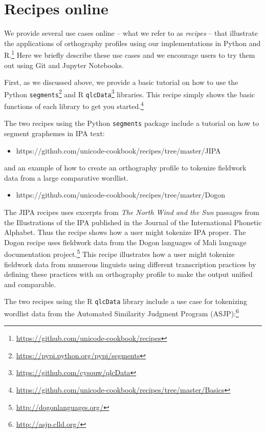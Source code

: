 \documentclass[output=book,nonflat,modfonts,
citecolor=brown,
		]{langsci/langscibook}\usepackage[]{graphicx}\usepackage[]{color}
\begin{document}
\section{Recipes online}
\label{use-cases}

We provide several use cases online -- what we refer to as \textit{recipes} -- that illustrate the applications of orthography profiles using our implementations in Python and R.\footnote{\url{https://github.com/unicode-cookbook/recipes}} Here we briefly describe these use cases and we encourage users to try them out using Git and Jupyter Notebooks.

First, as we discussed above, we provide a basic tutorial on how to use the Python \texttt{segments}\footnote{\url{https://pypi.python.org/pypi/segments}} and R \texttt{qlcData}\footnote{\url{https://github.com/cysouw/qlcData}} libraries. This recipe simply shows the basic functions of each library to get you started.\footnote{\url{https://github.com/unicode-cookbook/recipes/tree/master/Basics}}

The two recipes using the Python \texttt{segments} package include a tutorial on how to segment graphemes in IPA text:

\begin{itemize}
	\item https://github.com/unicode-cookbook/recipes/tree/master/JIPA
\end{itemize}
	
\noindent and an example of how to create an orthography profile to tokenize fieldwork data from a large comparative wordlist.

\begin{itemize}
	\item https://github.com/unicode-cookbook/recipes/tree/master/Dogon
\end{itemize}

\noindent The JIPA recipes uses excerpts from \textit{The North Wind and the Sun} passages from the Illustrations of the IPA published in the Journal of the International Phonetic Alphabet. Thus the recipe shows how a user might tokenize IPA proper. The Dogon recipe uses fieldwork data from the Dogon languages of Mali language documentation project.\footnote{\url{http://dogonlanguages.org/}} This recipe illustrates how a user might tokenize fieldwork data from numerous linguists using different transcription practices by defining these practices with an orthography profile to make the output unified and comparable.

The two recipes using the R \texttt{qlcData} library include a use case for tokenizing wordlist data from the Automated Similarity Judgment Program (ASJP):\footnote{\url{http://asjp.clld.org/}}
\end{document}

